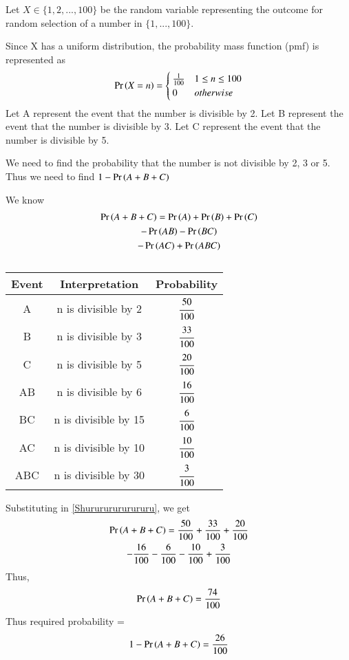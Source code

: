 Let $X \in  \{1,2,...,100\}$ be the random variable representing the outcome for random selection of a number in $\{1,...,100\}$.

Since X has a uniform distribution, the probability mass function (pmf) is represented as 
\begin{align}
    \Pr\left(X  = n\right) = 
    \begin{cases}
        \frac{1}{100} & 1  \le n \le 100 \\
        0 & otherwise
    \end{cases}
\end{align}
Let A represent the event that the number is divisible by 2.
Let B represent the event that the number is divisible by 3.
Let C represent the event that the number is divisible by 5.

We need to find the probability that the number is not divisible by 2, 3 or 5. Thus we need to find $1 - \Pr\left(A+B+C\right)$

We know 
\begin{multline}
    \pr{A+B+C} = \pr{A} + \pr{B} + \pr{C} \\- \pr{AB} - \pr{BC} \\- \pr{AC} + \pr{ABC}\label{Shurururururururu}    
\end{multline}

\begin{table}[!ht]
\begin{center}
\begin{tabular}{|c|c|c|}
\hline
Event & Interpretation  & Probability  \\
\hline
A    & n is divisible by 2  & $\cfrac{50}{100}$ \\
B    & n is divisible by 3  & $\cfrac{33}{100}$ \\
C    & n is divisible by 5  & $\cfrac{20}{100}$ \\
AB   & n is divisible by 6  & $\cfrac{16}{100}$ \\
BC   & n is divisible by 15 & $\cfrac{6}{100}$ \\
AC   & n is divisible by 10 & $\cfrac{10}{100}$ \\
ABC  & n is divisible by 30 & $\cfrac{3}{100}$ \\
\hline
\end{tabular}
\end{center}
\caption{}
\label{gate:11}
\end{table}
%
Substituting in \eqref{Shurururururururu}, we get
\begin{multline}
    \Pr\left(A+B+C\right) = \frac{50}{100} + \frac{33}{100} + \frac{20}{100} \\- \frac{16}{100} - \frac{6}{100} - \frac{10}{100} + \frac{3}{100} 
\end{multline}
Thus, 
\begin{align}
    \Pr\left(A+B+C\right) = \frac{74}{100}
\end{align}
Thus required probability = 
\begin{align}
    1 - \Pr\left(A+B+C\right) = \frac{26}{100}
\end{align}
